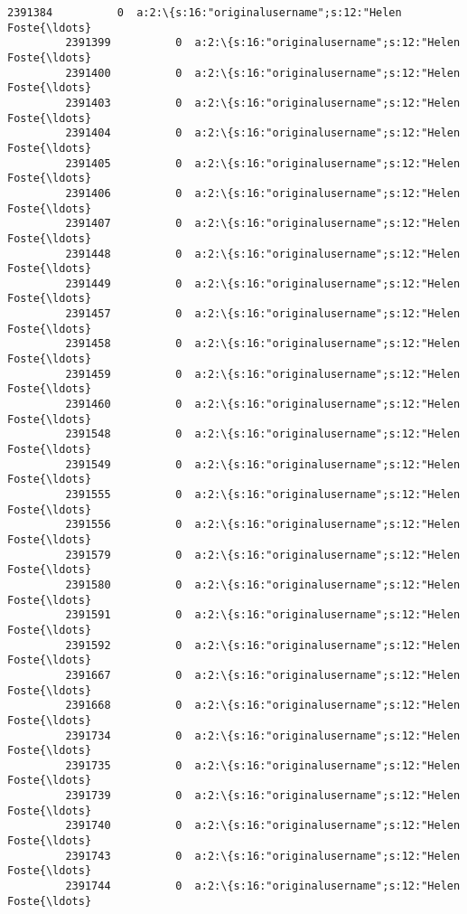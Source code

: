 \documentclass[11pt]{article}
\begin{document}
\begin{Verbatim}[commandchars=\\\{\}]
         2391384          0  a:2:\{s:16:"originalusername";s:12:"Helen Foste{\ldots}   
         2391399          0  a:2:\{s:16:"originalusername";s:12:"Helen Foste{\ldots}   
         2391400          0  a:2:\{s:16:"originalusername";s:12:"Helen Foste{\ldots}   
         2391403          0  a:2:\{s:16:"originalusername";s:12:"Helen Foste{\ldots}   
         2391404          0  a:2:\{s:16:"originalusername";s:12:"Helen Foste{\ldots}   
         2391405          0  a:2:\{s:16:"originalusername";s:12:"Helen Foste{\ldots}   
         2391406          0  a:2:\{s:16:"originalusername";s:12:"Helen Foste{\ldots}   
         2391407          0  a:2:\{s:16:"originalusername";s:12:"Helen Foste{\ldots}   
         2391448          0  a:2:\{s:16:"originalusername";s:12:"Helen Foste{\ldots}   
         2391449          0  a:2:\{s:16:"originalusername";s:12:"Helen Foste{\ldots}   
         2391457          0  a:2:\{s:16:"originalusername";s:12:"Helen Foste{\ldots}   
         2391458          0  a:2:\{s:16:"originalusername";s:12:"Helen Foste{\ldots}   
         2391459          0  a:2:\{s:16:"originalusername";s:12:"Helen Foste{\ldots}   
         2391460          0  a:2:\{s:16:"originalusername";s:12:"Helen Foste{\ldots}   
         2391548          0  a:2:\{s:16:"originalusername";s:12:"Helen Foste{\ldots}   
         2391549          0  a:2:\{s:16:"originalusername";s:12:"Helen Foste{\ldots}   
         2391555          0  a:2:\{s:16:"originalusername";s:12:"Helen Foste{\ldots}   
         2391556          0  a:2:\{s:16:"originalusername";s:12:"Helen Foste{\ldots}   
         2391579          0  a:2:\{s:16:"originalusername";s:12:"Helen Foste{\ldots}   
         2391580          0  a:2:\{s:16:"originalusername";s:12:"Helen Foste{\ldots}   
         2391591          0  a:2:\{s:16:"originalusername";s:12:"Helen Foste{\ldots}   
         2391592          0  a:2:\{s:16:"originalusername";s:12:"Helen Foste{\ldots}   
         2391667          0  a:2:\{s:16:"originalusername";s:12:"Helen Foste{\ldots}   
         2391668          0  a:2:\{s:16:"originalusername";s:12:"Helen Foste{\ldots}   
         2391734          0  a:2:\{s:16:"originalusername";s:12:"Helen Foste{\ldots}   
         2391735          0  a:2:\{s:16:"originalusername";s:12:"Helen Foste{\ldots}   
         2391739          0  a:2:\{s:16:"originalusername";s:12:"Helen Foste{\ldots}   
         2391740          0  a:2:\{s:16:"originalusername";s:12:"Helen Foste{\ldots}   
         2391743          0  a:2:\{s:16:"originalusername";s:12:"Helen Foste{\ldots}   
         2391744          0  a:2:\{s:16:"originalusername";s:12:"Helen Foste{\ldots}   
         

\end{Verbatim}
\end{document}
